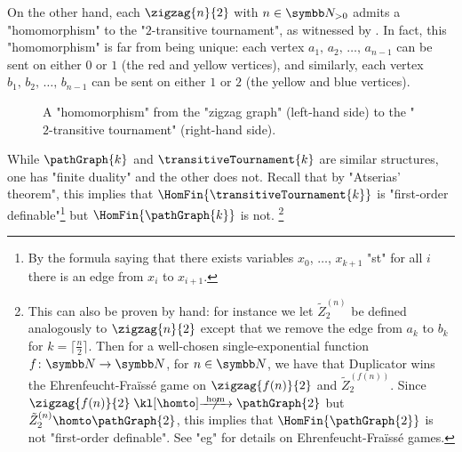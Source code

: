\begin{example}
	On the other hand, each $\zigzag{n}{2}$ with $n\in\Np$ admits a "homomorphism" to the "$2$-transitive tournament", as witnessed by .%
	In fact, this "homomorphism" is far from being unique:
	each vertex $a_1,\,a_2,\,\hdots,\,a_{n-1}$ can be sent on either $0$ or $1$
	(the red and yellow vertices), 
	and similarly, each vertex $b_1,\,b_2,\,\hdots,\,b_{n-1}$ can be sent on either $1$ or $2$
	(the yellow and blue vertices).%
	\begin{figure}
		\centering 
		\begin{tikzpicture}
			
		\end{tikzpicture}
		\caption{\AP\label{fig:zigzag-graph-hom-T2}A "homomorphism" from the "zigzag graph" (left-hand side) to the "$2$-transitive tournament" (right-hand side).}
	\end{figure}
\end{example}

While $\pathGraph{k}$ and $\transitiveTournament{k}$ are similar structures,
one has "finite duality" and the other does not.
Recall that by "Atserias' theorem", this implies that
$\HomFin{\transitiveTournament{k}}$ is "first-order definable"\footnote{By the formula saying that
there exists variables $x_0$, $\hdots$, $x_{k+1}$ "st" for all $i$ there is an edge from $x_i$ to $x_{i+1}$.} but $\HomFin{\pathGraph{k}}$ is not.%
\footnote{This can also be proven by hand: for 
instance we let $\tilde Z^{(n)}_2$ be defined analogously to $\zigzag{n}{2}$ except
that we remove the edge from $a_{k}$ to $b_k$ for $k = \lceil \frac{n}{2} \rceil$. 
Then for a well-chosen single-exponential function $f\colon \N \to \N$, for $n\in\N$,
we have that Duplicator wins the Ehrenfeucht-Fraïssé game on $\zigzag{f(n)}{2}$ and
$\tilde Z^{(f(n))}_2$. Since $\zigzag{f(n)}{2} \nothomto \pathGraph{2}$ but
$\tilde Z^{(n)}_2 \homto \pathGraph{2}$, this implies that $\HomFin{\pathGraph{2}}$ is not 
"first-order definable". See "eg" \cite[\S~3]{Kolaitis2007FiniteModelTheory} for details on
Ehrenfeucht-Fraïssé games.}


